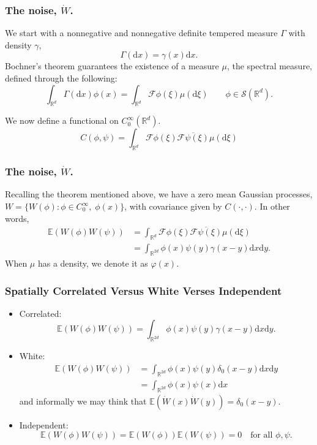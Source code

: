 \documentclass{beamer}
\numberwithin{equation}{section}
\newcommand{\R}{\mathbb{R}}
\newcommand{\ud}{\ensuremath{\mathrm{d}}}
\begin{document}
	\begin{frame}[t]
		\frametitle{The noise, $\dot{W}$.}
		We start with a nonnegative and nonnegative definite tempered measure $\Gamma$ with density $\gamma$,
		\[
		\Gamma(\ud x) = \gamma(x) \ud x.
		\]
		Bochner's theorem guarantees the existence of a measure $\mu$, the spectral measure, defined through the following:
		\[
		\int_{\R^d}\Gamma(\ud x) \phi(x) = \int_{\R^d} \mathcal{F}\phi(\xi) \mu(\ud \xi) \qquad \phi \in \mathscr{S}(\R^d).
		\]
		
	We now define a functional on $C_0^{\infty}(\R^d)$.
		\[
			C(\phi,\psi) =  \int_{\R^d} \mathcal{F}\phi(\xi) \overline{\mathcal{F}\psi(\xi)} \mu (\ud \xi)
		\]
	\end{frame}

\begin{frame}[t]
\frametitle{The noise, $\dot{W}$.}
Recalling the theorem mentioned above, we have a zero mean Gaussian processes,$W=\{ W(\phi) : \phi \in C_0^{\infty}, \; \phi(x)\}$, with covariance given by $C(\cdot,\cdot)$. In other words,
	\begin{align*}
		\mathbb{E}(W(\phi)W(\psi)) &= \int_{\R^d} \mathcal{F}\phi(\xi) \overline{\mathcal{F}\psi(\xi)} \mu (\ud \xi)
		\\ &= \int_{\R^{2d}} \phi(x)\psi(y) \gamma(x-y) \ud x \ud y.
	\end{align*}
When $\mu$ has a density, we denote it as $\varphi(x)$. 
	\end{frame}
	
	\begin{frame}
		\frametitle{Spatially Correlated Versus White Verses Independent}
\begin{itemize}
	\item Correlated: \[\mathbb{E}(W(\phi)W(\psi))=\int_{\R^{2d}} \phi(x)\psi(y) \gamma(x-y) \ud x \ud y.\]
	\item White: 
		\begin{align*}
			\mathbb{E}(W(\phi)W(\psi))&=\int_{\R^{2d}} \phi(x)\psi(y) \delta_0(x-y) \ud x \ud y
			\\&= \int_{\R^{2d}} \phi(x)\psi(x) \ud x 
		\end{align*}
		and informally we may think that $\mathbb{E}(\dot{W}(x)\dot{W}(y)) = \delta_0(x-y)$.
	\item Independent: \[ \mathbb{E}(W(\phi)W(\psi)) = \mathbb{E}(W(\phi))\mathbb{E}(W(\psi)) =0 \quad \text{for all } \phi, \psi.\]
\end{itemize}
	\end{frame}
	
\end{document}
